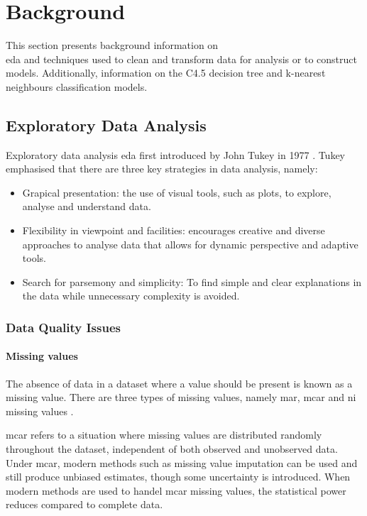 \documentclass[10pt, conference]{IEEEtran}
\begin{document}
\section{Background}

This section presents background information on \\ \acrlong{eda} and techniques used to clean and transform data
for analysis or to construct models. Additionally, information on the C4.5 decision tree and k-nearest neighbours
classification models.

\subsection{Exploratory Data Analysis}\label{EDA_background}

Exploratory data analysis \acrshort{eda} first introduced by John Tukey in 1977 \cite{EDA_ref}. Tukey
emphasised that there are three key strategies in data analysis, namely:
\begin{itemize}
    \item Grapical presentation: the use of visual tools, such as plots, to explore, analyse and understand data.
    \item Flexibility in viewpoint and facilities: encourages creative and diverse approaches to analyse data
          that allows for dynamic perspective and adaptive tools.
    \item Search for parsemony and simplicity: To find simple and clear explanations in the data while
          unnecessary complexity is avoided.
\end{itemize}

\subsubsection{Data Quality Issues}

\paragraph{Missing values}

The absence of data in a dataset where a value should be present is known as a missing value. There are
three types of missing values, namely \acrfull{mar}, \acrfull{mcar} and \acrfull{ni} missing values \cite{Missing_ref}.

\acrshort{mcar} refers to a situation where missing values are distributed randomly throughout the dataset, independent
of both observed and unobserved data. Under \acrshort{mcar}, modern methods such as missing value imputation can be
used and still produce unbiased estimates, though some uncertainty is introduced. When modern methods are used
to handel \acrshort{mcar} missing values, the statistical power reduces compared to complete data.
\end{document}
